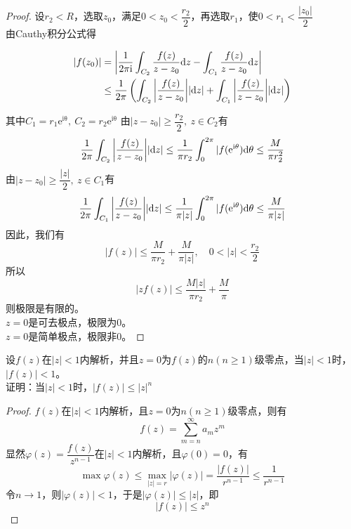 \begin{proof}
    
    设$r_2 < R$，选取$z_0$，满足$0 < z_0 < \dfrac{r_2}{2}$，再选取$r_1$，使$0 < r_1 < \dfrac{|z_0|}{2}$\\
    由\textup{Cauthy}积分公式得

    \begin{align*}
        |f(z_0)| & = \left| \dfrac{1}{2\mathrm{\pi i}} \int_{C_2}{\dfrac{f(z)}{z-z_0}}\mathrm{d} z - \int_{C_1}{\dfrac{f(z)}{z-z_0}}\mathrm{d} z \right|\\
        & \leq \dfrac{1}{2 \pi} \left(\int_{C_2}{\left|\dfrac{f(z)}{z-z_0}\right|}|\mathrm{d} z| + \int_{C_1}{\left|\dfrac{f(z)}{z-z_0}\right|}|\mathrm{d} z|\right)
    \end{align*}

    其中$C_1 = r_1\mathrm{e^{i\theta}},\ C_2 = r_2\mathrm{e^{i\theta}}$
    由$|z-z_0| \geq \dfrac{r_2}{2},\ z \in C_2$有
    $$ \dfrac{1}{2 \pi} \int_{C_2}{\left| \dfrac{f(z)}{z-z_0}\right|}|\mathrm{d} z| \leq \dfrac{1}{ \pi r_2}\int_{0}^{2 \pi}{|f(\mathrm{e}^{\mathrm{i}\theta})}\mathrm{d} \theta \leq \dfrac{M}{ \pi r_2^2}$$
    由$|z-z_0| \geq \dfrac{|z|}{2},\ z \in C_1$有
    $$ \dfrac{1}{2 \pi} \int_{C_1}{\left| \dfrac{f(z)}{z-z_0}\right|}|\mathrm{d} z| \leq \dfrac{1}{ \pi|z|}\int_{0}^{2 \pi}{|f(\mathrm{e}^{\mathrm{i}\theta})}\mathrm{d} \theta \leq \dfrac{M}{ \pi|z|}$$
    因此，我们有
    $$|f(z)| \leq \dfrac{M}{ \pi r_2} + \dfrac{M}{ \pi|z|},\quad 0 < |z| < \dfrac{r_2}{2}$$
    所以$$|zf(z)| \leq \dfrac{M|z|}{ \pi r_2} + \dfrac{M}{\pi}$$
    则极限是有限的。\\
    $z=0$是可去极点，极限为$0$。\\
    $z=0$是简单极点，极限非$0$。

\end{proof}

\begin{proposition}

    设$f(z)$在$|z| < 1 $内解析，并且$z = 0$为$f(z)$的$n(n \geq 1)$级零点，当$|z|<1$时，$|f(z)| < 1$。\\
    证明：当$|z|<1$时，$|f(z)| \leq |z|^n$

\end{proposition}

\begin{proof}
    
    $f(z)$在$|z|<1$内解析，且$z = 0$为$n(n \geq 1)$级零点，则有
    $$f(z) = \sum_{m = n}^{\infty}{a_mz^m}$$
    显然$\varphi(z) = \dfrac{f(z)}{z^{n-1}}$在$|z|<1$内解析，且$\varphi(0) = 0$，有
    $$ \max\varphi(z) \leq \max_{|z| = r}|\varphi(z)| = \dfrac{|f(z)|}{r^{n-1}} \leq \dfrac{1}{r^{n-1}} $$
    令$n \to 1$，则$|\varphi(z)| < 1$，于是$|\varphi(z)| \leq |z|$，即
    $$|f(z)| \leq z^n$$

\end{proof}

